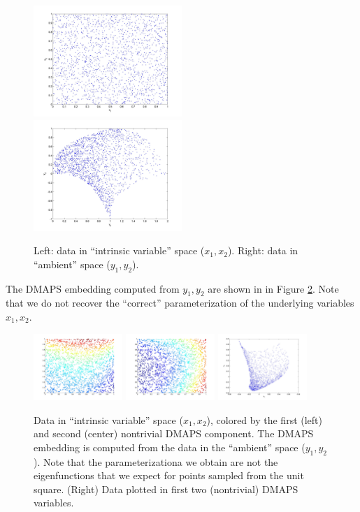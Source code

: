 \documentclass[12pt]{article}
\begin{document}
\begin{figure}[htb]
\includegraphics[width=0.5\textwidth]{xdata}
\includegraphics[width=0.5\textwidth]{ydata}
\caption{Left: data in ``intrinsic variable'' space ($x_1, x_2$). Right: data in ``ambient'' space ($y_1, y_2$).}
\label{fig:data}
\end{figure}

The DMAPS embedding computed from $y_1, y_2$ are shown in in Figure \ref{fig:xdata_dmaps}.
%
Note that we do not recover the ``correct'' parameterization of the underlying variables $x_1, x_2$.

\begin{figure}[H]
\includegraphics[width=0.3\textwidth]{xdata_colored_DMAPS1}
\includegraphics[width=0.3\textwidth]{xdata_colored_DMAPS2}
\includegraphics[width=0.3\textwidth]{embedding_dmaps}
\caption{Data in ``intrinsic variable'' space ($x_1, x_2$), colored by the first (left) and second (center) nontrivial DMAPS component. The DMAPS embedding is computed from the data in the ``ambient'' space ($y_1, y_2$). Note that the parameterizationa we obtain are not the eigenfunctions that we expect for points sampled from the unit square. (Right) Data plotted in first two (nontrivial) DMAPS variables.}
\label{fig:xdata_dmaps}
\end{figure}
\end{document}

